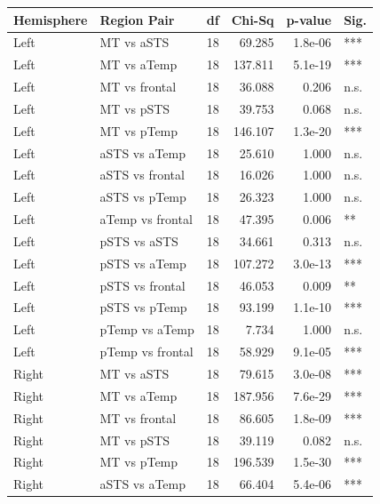 \begin{table}[h]
\centering
\begin{tabular}{llrrrl}
\toprule
 Hemisphere   & Region Pair      &   df &   Chi-Sq &   p-value & Sig.   \\
\midrule
 Left         & MT vs aSTS       &   18 &   69.285 &   1.8e-06 & ***    \\
 Left         & MT vs aTemp      &   18 &  137.811 &   5.1e-19 & ***    \\
 Left         & MT vs frontal    &   18 &   36.088 &     0.206 & n.s.   \\
 Left         & MT vs pSTS       &   18 &   39.753 &     0.068 & n.s.   \\
 Left         & MT vs pTemp      &   18 &  146.107 &   1.3e-20 & ***    \\
 Left         & aSTS vs aTemp    &   18 &   25.610 &     1.000 & n.s.   \\
 Left         & aSTS vs frontal  &   18 &   16.026 &     1.000 & n.s.   \\
 Left         & aSTS vs pTemp    &   18 &   26.323 &     1.000 & n.s.   \\
 Left         & aTemp vs frontal &   18 &   47.395 &     0.006 & **     \\
 Left         & pSTS vs aSTS     &   18 &   34.661 &     0.313 & n.s.   \\
 Left         & pSTS vs aTemp    &   18 &  107.272 &   3.0e-13 & ***    \\
 Left         & pSTS vs frontal  &   18 &   46.053 &     0.009 & **     \\
 Left         & pSTS vs pTemp    &   18 &   93.199 &   1.1e-10 & ***    \\
 Left         & pTemp vs aTemp   &   18 &    7.734 &     1.000 & n.s.   \\
 Left         & pTemp vs frontal &   18 &   58.929 &   9.1e-05 & ***    \\
 Right        & MT vs aSTS       &   18 &   79.615 &   3.0e-08 & ***    \\
 Right        & MT vs aTemp      &   18 &  187.956 &   7.6e-29 & ***    \\
 Right        & MT vs frontal    &   18 &   86.605 &   1.8e-09 & ***    \\
 Right        & MT vs pSTS       &   18 &   39.119 &     0.082 & n.s.   \\
 Right        & MT vs pTemp      &   18 &  196.539 &   1.5e-30 & ***    \\
 Right        & aSTS vs aTemp    &   18 &   66.404 &   5.4e-06 & ***    \\

\end{tabular}
\end{table}

